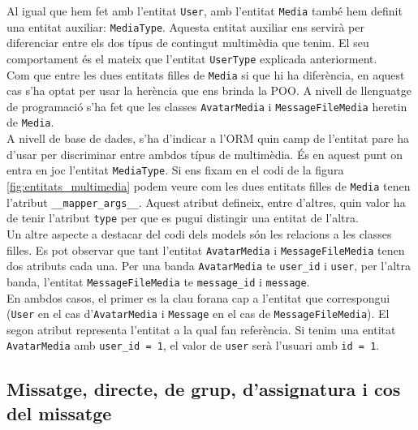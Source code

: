     Al igual que hem fet amb l'entitat \texttt{User}, amb l'entitat \texttt{Media} també hem definit una entitat auxiliar: \texttt{MediaType}. Aquesta entitat auxiliar ens servirà per diferenciar entre els dos típus de contingut multimèdia que tenim. El seu comportament és el mateix que l'entitat \texttt{UserType} explicada anteriorment.\\
    
    Com que entre les dues entitats filles de \texttt{Media} si que hi ha diferència, en aquest cas s'ha optat per usar la herència que ens brinda la \ac{POO}. A nivell de llenguatge de programació s'ha fet que les classes \texttt{AvatarMedia} i \texttt{MessageFileMedia} heretin de \texttt{Media}.\\
    
     A nivell de base de dades, s'ha d'indicar a l'\ac{ORM} quin camp de l'entitat pare ha d'usar per discriminar entre ambdos típus de multimèdia. És en aquest punt on entra en joc l'entitat \texttt{MediaType}. Si ens fixam en el codi de la figura \ref{fig:entitats_multimedia} podem veure com les dues entitats filles de \texttt{Media} tenen l'atribut \texttt{\_\_mapper\_args\_\_}. Aquest atribut defineix, entre d'altres, quin valor ha de tenir l'atribut \texttt{type} per que es pugui distingir una entitat de l'altra.\\
    
    Un altre aspecte a destacar del codi dels models són les relacions a les classes filles. Es pot observar que tant l'entitat \texttt{AvatarMedia} i \texttt{MessageFileMedia} tenen dos atributs cada una. Per una banda \texttt{AvatarMedia} te \texttt{user\_id} i \texttt{user}, per l'altra banda, l'entitat \texttt{MessageFileMedia} te \texttt{message\_id} i \texttt{message}. \\
    
    En ambdos casos, el primer es la clau forana cap a l'entitat que correspongui (\texttt{User} en el cas d'\texttt{AvatarMedia} i \texttt{Message} en el cas de \texttt{MessageFileMedia}). El segon atribut representa l'entitat a la qual fan referència. Si tenim una entitat \texttt{AvatarMedia} amb \texttt{user\_id = 1}, el valor de \texttt{user} serà l'usuari amb \texttt{id = 1}.\\
   
    \subsection{Missatge, directe, de grup, d'assignatura i cos del missatge}\label{missatge_directe_grup_assignatura}
    
